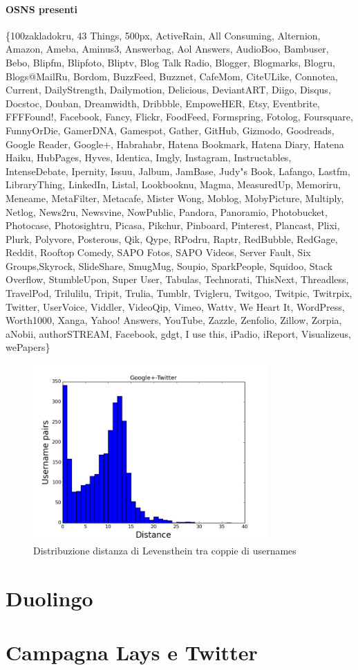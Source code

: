\paragraph{OSNS presenti}
\{100zakladokru, 43 Things, 500px, ActiveRain, All Consuming, Alternion, Amazon, Ameba, Aminus3, Answerbag, Aol Answers, AudioBoo, Bambuser, Bebo, Blipfm, Blipfoto, Bliptv, Blog Talk Radio, Blogger, Blogmarks, Blogru, Blogs@MailRu, Bordom, BuzzFeed, Buzznet, CafeMom, CiteULike, Connotea, Current, DailyStrength, Dailymotion, Delicious, DeviantART, Diigo, Disqus, Docstoc, Douban, Dreamwidth, Dribbble, EmpoweHER, Etsy, Eventbrite, FFFFound!, Facebook, Fancy, Flickr, FoodFeed, Formspring, Fotolog, Foursquare, FunnyOrDie, GamerDNA, Gamespot, Gather, GitHub, Gizmodo, Goodreads, Google Reader, Google+, Habrahabr, Hatena Bookmark, Hatena Diary, Hatena Haiku, HubPages, Hyves, Identica, Imgly, Instagram, Instructables, IntenseDebate, Ipernity, Issuu, Jalbum, JamBase, Judy"s Book, Lafango, Lastfm, LibraryThing, LinkedIn, Listal, Lookbooknu, Magma, MeasuredUp, Memoriru, Meneame, MetaFilter, Metacafe, Mister Wong, Moblog, MobyPicture, Multiply, Netlog, News2ru, Newsvine, NowPublic, Pandora, Panoramio, Photobucket, Photocase, Photosightru, Picasa, Pikchur, Pinboard, Pinterest, Plancast, Plixi, Plurk, Polyvore, Posterous, Qik, Qype, RPodru, Raptr, RedBubble, RedGage, Reddit, Rooftop Comedy, SAPO Fotos, SAPO Videos, Server Fault, Six Groups,Skyrock, SlideShare, SmugMug, Soupio, SparkPeople, Squidoo, Stack Overflow, StumbleUpon, Super User, Tabulas, Technorati, ThisNext, Threadless, TravelPod, Trilulilu, Tripit, Trulia, Tumblr, Tvigleru, Twitgoo, Twitpic, Twitrpix, Twitter, UserVoice, Viddler, VideoQip, Vimeo, Wattv, We Heart It, WordPress, Worth1000, Xanga, Yahoo! Answers, YouTube, Zazzle, Zenfolio, Zillow, Zorpia, aNobii, authorSTREAM, Facebook, gdgt, I use this, iPadio, iReport, Visualizeus, wePapers\}

\begin{figure}[ht!]
\centering
\includegraphics[width=90mm]{chapters/distanceplot/Google+-Twitter.png}
\caption{Distribuzione distanza di Levensthein tra coppie di usernames  \label{overflow}}
\end{figure}

\section{Duolingo}
\section{Campagna Lays e Twitter}
